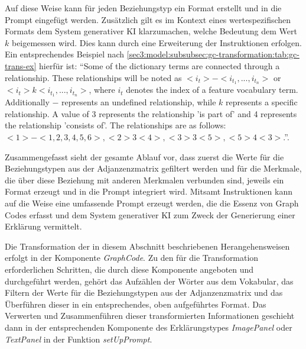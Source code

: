 Auf diese Weise kann für jeden Beziehungstyp ein Format erstellt und in die Prompt eingefügt werden.
Zusätzlich gilt es im Kontext eines wertespezifischen Formats dem System generativer KI klarzumachen, welche Bedeutung dem Wert $k$ beigemessen wird.
Dies kann durch eine Erweiterung der Instruktionen erfolgen.
Ein entsprechendes Beispiel nach \cref{sec3:model:subsubsec:gc-transformation:tab:gc-trans-ex} hierfür ist: \enquote{Some of the dictionary terms are connected through a relationship. These relationships will be noted as $<i_{t}> - <i_{t_{1}},...,i_{t_{n}}>$ or $<i_{t}> k <i_{t_{1}},...,i_{t_{n}}>$, where $i_{t}$ denotes the index of a feature vocabulary term. Additionally $-$ represents an undefined relationship, while $k$ represents a specific relationship. A value of 3 represents the relationship 'is part of' and 4 represents the relationship 'consists of'. The relationships are as follows: $<1> - <1,2,3,4,5,6>, <2> 3 <4>, <3> 3 <5>, <5> 4 <3>$.}.

Zusammengefasst sieht der gesamte Ablauf vor, dass zuerst die Werte für die Beziehungstypen aus der Adjanzenzmatrix gefiltert werden und für die Merkmale, die über diese Beziehung mit anderen Merkmalen verbunden sind, jeweils ein Format erzeugt und in die Prompt integriert wird.
Mitsamt Instruktionen kann auf die Weise eine umfassende Prompt erzeugt werden, die die Essenz von Graph Codes erfasst und dem System generativer KI zum Zweck der Generierung einer Erklärung vermittelt.

Die Transformation der in diesem Abschnitt beschriebenen Herangehensweisen erfolgt in der Komponente \textit{GraphCode}.
Zu den für die Transformation erforderlichen Schritten, die durch diese Komponente angeboten und durchgeführt werden, gehört das Aufzählen der Wörter aus dem Vokabular, das Filtern der Werte für die Beziehungstypen aus der Adjanzenzmatrix und das Überführen dieser in ein entsprechendes, oben aufgeführtes Format.
Das Verwerten und Zusammenführen dieser transformierten Informationen geschieht dann in der entsprechenden Komponente des Erklärungstypes \textit{ImagePanel} oder \textit{TextPanel} in der Funktion \textit{setUpPrompt}.


